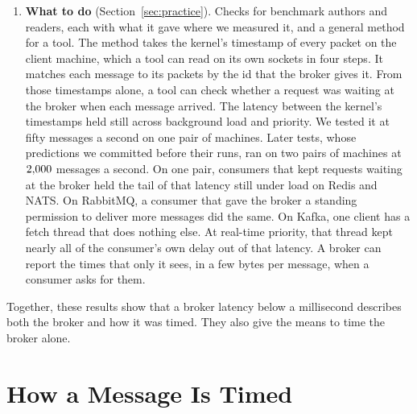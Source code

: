 \documentclass[10pt,journal,compsoc]{IEEEtran}
\newcommand{\kafka}{Kafka}
\newcommand{\redis}{Redis}
\begin{document}
\begin{enumerate}
is the Storage Benchmark Kit (SBK). Under the strictest reading of our classification,
\auditStrictWord{} still cut them. Of the \toolsRunWord{} tools we ran, \toolsOneProcessWord{} take
both timestamps in one process, where no clock offset can reach them. But \toolsOneProcessTripWord{}
of those time a round trip and \toolsOneProcessAckWord{} only the acknowledgment. Neither is a
delivery's \emph{one-way delay}~\cite{rfc7679}. A one-way delay is the time from the sender to the
receiver. The rest cannot see the wait of a separate receiving process. On a millisecond clock, a
filter that keeps only latencies above zero also deletes the fastest messages. No public report we
audited says how many samples such a filter kept. The brokers that the industry's tools time report
at most when a message arrived, or its whole time at the broker in milliseconds.
\item \textbf{What to do} (Section~\ref{sec:practice}). Checks for benchmark authors and readers,
each with what it gave where we measured it, and a general method for a tool. The method takes the
kernel's timestamp of every packet on the client machine, which a tool can read on its own sockets
in four steps. It matches each message to its packets by the id that the broker gives it. From
those timestamps alone, a tool can check whether a request was waiting at the broker when each
message arrived. The latency between the kernel's timestamps held still across background load and
priority. We tested it at fifty messages a second on one pair of machines. Later tests, whose
predictions we committed before their runs, ran on two pairs of machines at $2{,}000$ messages a
second. On one pair, consumers that kept requests
waiting at the broker held the tail of that latency still under load on \redis{} and NATS. On
RabbitMQ, a consumer that gave the broker a standing permission to deliver more messages did the
same. On \kafka{}, one client has a fetch
thread that does nothing else. At real-time priority, that thread kept nearly all of the consumer's
own delay out of that latency. A broker can report the times that only it sees, in a few bytes per
message, when a consumer asks for them.
\end{enumerate}
Together, these results show that a broker latency below a millisecond describes both the broker
and how it was timed. They also give the means to time the broker alone.


\section{How a Message Is Timed}
\label{sec:sysmodel}
\label{sec:method}
\end{document}
